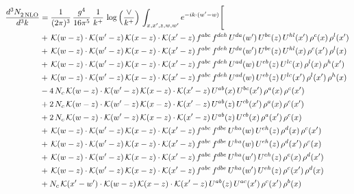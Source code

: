 \documentclass[9pt]{article}
\numberwithin{equation}{section}
\begin{document}
\begin{align}
    \frac{d^{3}N_{2\,\rm NLO}^{\rm}}{d^{3}k}  & = \frac{1}{(2\pi)^{3}}\,\frac{g^{4}}{16\pi^{5}}\,\frac{1}{k^{+}}\,\log{\left(\frac{\vee}{k^{+}}\right)}\, \int_{x,x',z,w,w'}e^{-ik\cdot(w'-w)}\Bigg[\notag\\ &
    +\,\mathcal{K}(w-z)\cdot\mathcal{K}(w'-z)\,\mathcal{K}(x-z)\cdot\mathcal{K}(x'-z)\,f^{abc}\,f^{deh}\,U^{da}(w')\,U^{be}(z)\,U^{hl}(x')\,\rho^{c}(x)\,\rho^{l}(x')\notag \\
&+\,\mathcal{K}(w-z)\cdot\mathcal{K}(w'-z)\,\mathcal{K}(x-z)\cdot\mathcal{K}(x'-z)\,f^{abc}\,f^{deh}\,U^{da}(w')\,U^{be}(z)\,U^{hl}(x)\,\rho^{c}(x')\,\rho^{l}(x)\notag \\
&+\,\mathcal{K}(w-z)\cdot\mathcal{K}(w'-z)\,\mathcal{K}(x-z)\cdot\mathcal{K}(x'-z)\,f^{abc}\,f^{deh}\,U^{ad}(w)\,U^{eb}(z)\,U^{lc}(x)\,\rho^{l}(x)\,\rho^{h}(x')\notag \\
&+\,\mathcal{K}(w-z)\cdot\mathcal{K}(w'-z)\,\mathcal{K}(x-z)\cdot\mathcal{K}(x'-z)\,f^{abc}\,f^{deh}\,U^{ad}(w)\,U^{eb}(z)\,U^{lc}(x')\,\rho^{l}(x')\,\rho^{h}(x)\notag \\
&-4\,N_{c}\,\mathcal{K}(w-z)\cdot\mathcal{K}(w'-z)\,\mathcal{K}(x-z)\cdot\mathcal{K}(x'-z)\,U^{ab}(x)\,U^{bc}(x')\,\rho^{a}(x)\,\rho^{c}(x')\notag \\
&+2\,N_{c}\,\mathcal{K}(w-z)\cdot\mathcal{K}(w'-z)\,\mathcal{K}(x-z)\cdot\mathcal{K}(x'-z)\,U^{ab}(z)\,U^{cb}(x')\,\rho^{a}(x)\,\rho^{c}(x')\notag \\
&+2\,N_{c}\,\mathcal{K}(w-z)\cdot\mathcal{K}(w'-z)\,\mathcal{K}(x-z)\cdot\mathcal{K}(x'-z)\,U^{ab}(z)\,U^{cb}(x)\,\rho^{a}(x')\,\rho^{c}(x)\notag \\
&+\,\mathcal{K}(w-z)\cdot\mathcal{K}(w'-z)\,\mathcal{K}(x-z)\cdot\mathcal{K}(x'-z)\,f^{abc}\,f^{dbe}\,U^{ha}(w)\,U^{eh}(z)\,\rho^{d}(x)\,\rho^{c}(x')\notag \\
&+\,\mathcal{K}(w-z)\cdot\mathcal{K}(w'-z)\,\mathcal{K}(x-z)\cdot\mathcal{K}(x'-z)\,f^{abc}\,f^{dbe}\,U^{ha}(w)\,U^{eh}(z)\,\rho^{d}(x')\,\rho^{c}(x)\notag \\
&+\,\mathcal{K}(w-z)\cdot\mathcal{K}(w'-z)\,\mathcal{K}(x-z)\cdot\mathcal{K}(x'-z)\,f^{abc}\,f^{dbe}\,U^{ha}(w')\,U^{eh}(z)\,\rho^{c}(x)\,\rho^{d}(x')\notag \\
&+\,\mathcal{K}(w-z)\cdot\mathcal{K}(w'-z)\,\mathcal{K}(x-z)\cdot\mathcal{K}(x'-z)\,f^{abc}\,f^{dbe}\,U^{ha}(w')\,U^{eh}(z)\,\rho^{c}(x')\,\rho^{d}(x)\notag \\
&+N_{c}\,\mathcal{K}(x'-w')\cdot\mathcal{K}(w-z)\,\mathcal{K}(x-z)\cdot\mathcal{K}(x'-z)\,U^{ab}(z)\,U^{ac}(x')\,\rho^{c}(x')\,\rho^{b}(x)\notag \\

\end{align}
\end{document}
